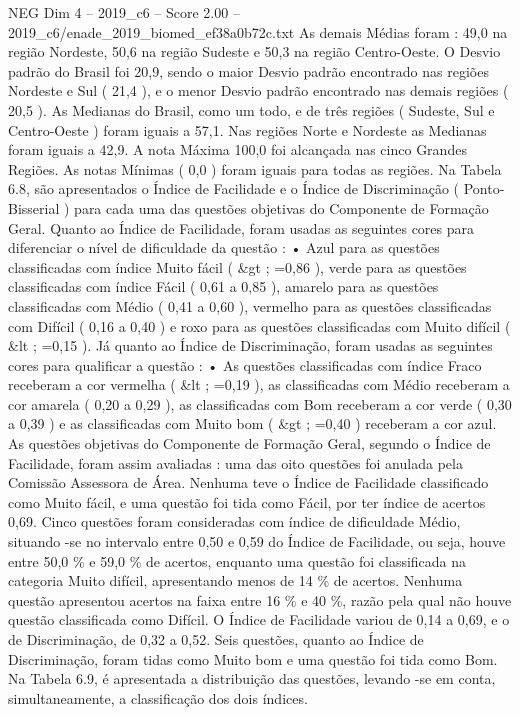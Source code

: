 \begin{textsample}{NEG Dim 4 – 2019\_c6 – Score 2.00 – 2019\_c6/enade\_2019\_biomed\_ef38a0b72c.txt}
As demais Médias foram : 49,0 na região Nordeste, 50,6 na região Sudeste e 50,3 na região Centro-Oeste.
O Desvio padrão do Brasil foi 20,9, sendo o maior Desvio padrão encontrado nas regiões Nordeste e Sul ( 21,4 ), e o menor Desvio padrão encontrado nas demais regiões ( 20,5 ).
As Medianas do Brasil, como um todo, e de três regiões ( Sudeste, Sul e Centro-Oeste ) foram iguais a 57,1.
Nas regiões Norte e Nordeste as Medianas foram iguais a 42,9.
A nota Máxima 100,0 foi alcançada nas cinco Grandes Regiões.
As notas Mínimas ( 0,0 ) foram iguais para todas as regiões.
Na Tabela 6.8, são apresentados o Índice de Facilidade e o Índice de Discriminação ( Ponto-Bisserial ) para cada uma das questões objetivas do Componente de Formação Geral.
Quanto ao Índice de Facilidade, foram usadas as seguintes cores para diferenciar o nível de dificuldade da questão : • Azul para as questões classificadas com índice Muito fácil ( \&gt ; =0,86 ), verde para as questões classificadas com índice Fácil ( 0,61 a 0,85 ), amarelo para as questões classificadas com Médio ( 0,41 a 0,60 ), vermelho para as questões classificadas com Difícil ( 0,16 a 0,40 ) e roxo para as questões classificadas com Muito difícil ( \&lt ; =0,15 ).
Já quanto ao Índice de Discriminação, foram usadas as seguintes cores para qualificar a questão : • As questões classificadas com índice Fraco receberam a cor vermelha ( \&lt ; =0,19 ), as classificadas com Médio receberam a cor amarela ( 0,20 a 0,29 ), as classificadas com Bom receberam a cor verde ( 0,30 a 0,39 ) e as classificadas com Muito bom ( \&gt ; =0,40 ) receberam a cor azul.
As questões objetivas do Componente de Formação Geral, segundo o Índice de Facilidade, foram assim avaliadas : uma das oito questões foi anulada pela Comissão Assessora de Área.
Nenhuma teve o Índice de Facilidade classificado como Muito fácil, e uma questão foi tida como Fácil, por ter índice de acertos 0,69.
Cinco questões foram consideradas com índice de dificuldade Médio, situando -se no intervalo entre 0,50 e 0,59 do Índice de Facilidade, ou seja, houve entre 50,0 \% e 59,0 \% de acertos, enquanto uma questão foi classificada na categoria Muito difícil, apresentando menos de 14 \% de acertos.
Nenhuma questão apresentou acertos na faixa entre 16 \% e 40 \%, razão pela qual não houve questão classificada como Difícil.
O Índice de Facilidade variou de 0,14 a 0,69, e o de Discriminação, de 0,32 a 0,52.
Seis questões, quanto ao Índice de Discriminação, foram tidas como Muito bom e uma questão foi tida como Bom.
Na Tabela 6.9, é apresentada a distribuição das questões, levando -se em conta, simultaneamente, a classificação dos dois índices.

\end{textsample}
